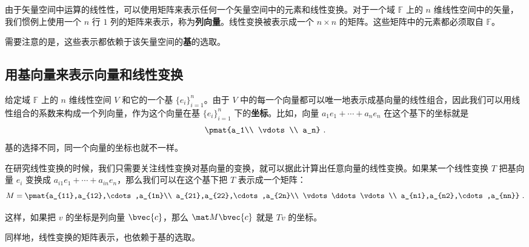 
\begin{issues}
\issueDraft
{}
\end{issues}


由于矢量空间中运算的线性性，可以使用矩阵来表示任何一个矢量空间中的元素和线性变换。对于一个域 $\mathbb{F}$ 上的 $n$ 维线性空间中的矢量，我们惯例上使用一个 $n$ 行 $1$ 列的矩阵来表示，称为\textbf{列向量}。线性变换被表示成一个 $n\times n$ 的矩阵。这些矩阵中的元素都必须取自 $\mathbb{F}$。

需要注意的是，这些表示都依赖于该矢量空间的\textbf{基}的选取。


\subsection{用基向量来表示向量和线性变换}

给定域 $\mathbb{F}$ 上的 $n$ 维线性空间 $V$ 和它的一个基 $\{{e}_i\}_{i=1}^{n}$。由于 $V$ 中的每一个向量都可以唯一地表示成基向量的线性组合，因此我们可以用线性组合的系数来构成一个列向量，作为这个向量在基 $\{{e}_i\}_{i=1}^{n}$ 下的\textbf{坐标}。比如，向量 $a_1 {e}_1+\cdots+a_n {e}_n$ 在这个基下的坐标就是
\begin{equation}
\pmat{a_1\\ \vdots\\ a_n}~.
\end{equation}
基的选择不同，同一个向量的坐标也就不一样。

在研究线性变换的时候，我们只需要关注线性变换对基向量的变换，就可以据此计算出任意向量的线性变换。如果某一个线性变换 $T$ 把基向量 ${e}_i$ 变换成 $a_{i1} {e}_1+\cdots+a_{in} {e}_n$，那么我们可以在这个基下把 $T$ 表示成一个矩阵：
\begin{equation}
M=\pmat{a_{11},a_{12},\cdots,a_{1n}\\ a_{21},a_{22},\cdots,a_{2n}\\ \vdots\ddots\vdots\\ a_{n1},a_{n2},\cdots,a_{nn}}~.
\end{equation}

这样，如果把 ${v}$ 的坐标是列向量 $\bvec {c}$，那么 $\mat M\bvec{c}$ 就是 $T{v}$ 的坐标。

同样地，线性变换的矩阵表示，也依赖于基的选取。

